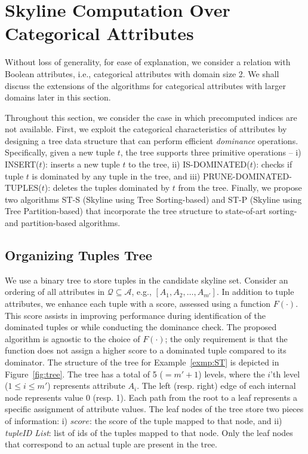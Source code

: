 \section{Skyline Computation Over Categorical Attributes}\label{sec:3}
Without loss of generality, for ease of explanation, we consider a relation with Boolean attributes, i.e., categorical attributes with domain size 2. We shall discuss the extensions of the algorithms for categorical attributes with larger domains later in this section.

Throughout this section, we consider the case in which precomputed indices are not available. First, we exploit the categorical characteristics of attributes by designing a tree data structure that can perform efficient {\em dominance} operations. Specifically, given a new tuple $t$, the tree supports three primitive operations -- i) INSERT($t$): inserts a new tuple $t$ to the tree, ii) IS-DOMINATED($t$): checks if tuple $t$ is dominated by any tuple in the tree, and iii) PRUNE-DOMINATED-TUPLES($t$): deletes the tuples dominated by $t$ from the tree. Finally, we propose two algorithms ST-S (Skyline using Tree Sorting-based) and ST-P (Skyline using Tree Partition-based) that incorporate the tree structure to state-of-art sorting- and partition-based algorithms.

\vspace{-3mm}
\subsection{Organizing Tuples Tree}\label{subsec:tree}
 We use a binary tree to store tuples in the candidate skyline set. Consider an ordering of all attributes in $\mathcal{Q} \subseteq \mathcal{A}$, e.g., $[A_1, A_2, \ldots, A_{m'}]$.
In addition to tuple attributes, we enhance each tuple with a score, assessed using a function $F(\cdot)$. This score assists in improving performance during identification of the dominated tuples or while conducting the dominance check. The proposed algorithm is agnostic to the choice of $F(\cdot)$; the only requirement is that the function does not assign a higher score to a dominated tuple compared to its dominator.
The structure of the tree for Example~\ref{exmp:ST} is depicted in Figure~\ref{fig:tree}. The tree has a total of 5 ($=m'+ 1$) levels, where the $i$'th level ($1 \leq i \leq m'$) represents attribute $A_i$. The left (resp. right) edge of each internal node represents value 0 (resp. 1). Each path from the root to a leaf represents a specific assignment of attribute values. The leaf nodes of the tree store two pieces of information: i) $score$: the score of the tuple mapped to that node, and ii) \textit{tupleID List}: list of ids of the tuples mapped to that node. 
Only the leaf nodes that correspond to an actual tuple are present in the tree. 


